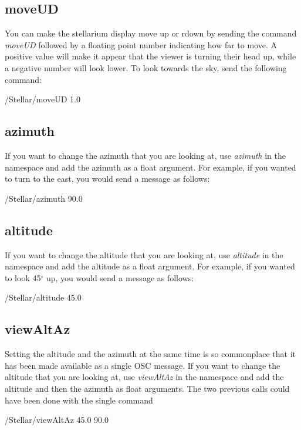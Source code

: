 \subsection{moveUD} 
You can make the stellarium display move up or rdown by sending the command \textit{moveUD} followed by a floating point number indicating how far to move. A positive value will make it appear that the viewer is turning their head up, while a negative number will look lower. To look towards the sky, send the following command:
\begin{syntax}	
	\medskip
	/Stellar/moveUD 1.0
	\medskip
\end{syntax}
\bigskip

\subsection{azimuth} 
If you want to change the azimuth that you are looking at, use \textit{azimuth} in the namespace and add the azimuth as a float argument. For example, if you wanted to turn to the east, you would send a message as follows:
 \begin{syntax}	
	\medskip
	/Stellar/azimuth 90.0
	\medskip
\end{syntax}

\subsection{altitude} 
If you want to change the altitude that you are looking at, use \textit{altitude} in the namespace and add the altitude as a float argument. For example, if you wanted to look 45$^{\circ}$ up, you would send a message as follows:
\begin{syntax}	
	\medskip
	/Stellar/altitude 45.0
	\medskip
\end{syntax}

\subsection{viewAltAz} 
Setting the altitude and the azimuth at the same time is so commonplace that it has been made available as a single OSC message.
If you want to change the altitude that you are looking at, use \textit{viewAltAz} in the namespace and add the altitude and then the azimuth as float arguments. The two previous calls could have been done with the single command
\begin{syntax}	
	\medskip
	/Stellar/viewAltAz 45.0 90.0
	\medskip
\end{syntax}

